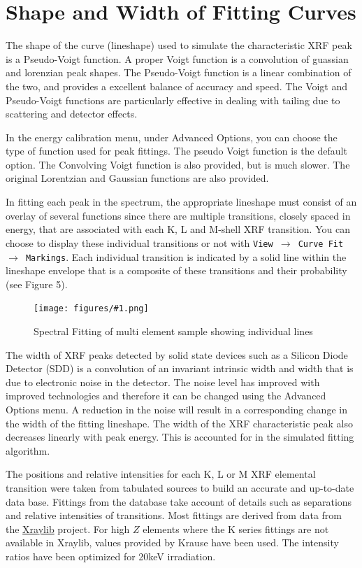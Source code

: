 \documentclass[article,twoside,11pt]{report}
\newcommand{\command}[1]{\texttt{#1}}
\newcommand{\menu}[0]{$\rightarrow$}
\newcommand{\screenshot}[2]{%
\begin{figure}[h!]
\centering\texttt{[image: figures/\#1.png]}
\caption{#2}
\end{figure}
}
\newcommand{\tocsection}[1]{\section*{#1}\addcontentsline{toc}{section}{#1}}
\begin{document}
\tocsection{Shape and Width of Fitting Curves}

The shape of the curve (lineshape) used to simulate the characteristic XRF peak is a Pseudo-Voigt function. A proper Voigt function is a convolution of guassian and lorenzian peak shapes. The Pseudo-Voigt function is a linear combination of the two, and provides a excellent balance of accuracy and speed. The Voigt and Pseudo-Voigt functions are particularly effective in dealing with tailing due to scattering and detector effects. 

In the energy calibration menu, under Advanced Options, you can choose the type of function used for peak fittings. The pseudo Voigt function is the default option. The Convolving Voigt function is also provided, but is much slower. The original Lorentzian and Gaussian functions are also provided.

In fitting each peak in the spectrum, the appropriate lineshape must consist of an overlay of several functions since there are multiple transitions, closely spaced in energy, that are associated with each K, L and M-shell XRF transition. You can choose to display these individual transitions or not with \command{View \menu\ Curve Fit \menu\ Markings}. Each individual transition is indicated by a solid line within the lineshape envelope that is a composite of these transitions and their probability (see Figure 5). 

\screenshot{fitting-markings}{Spectral Fitting of multi element sample showing individual lines}

The width of XRF peaks detected by solid state devices such as a Silicon Diode Detector (SDD) is a convolution of an invariant intrinsic width and width that is due to electronic noise in the detector. The noise level has improved with improved technologies and therefore it can be changed using the Advanced Options menu. A reduction in the noise will result in a corresponding change in the width of the fitting lineshape. The width of the XRF characteristic peak also decreases linearly with peak energy. This is accounted for in the simulated fitting algorithm.   

The positions and relative intensities for each K, L or M XRF elemental transition were taken from tabulated sources to build an accurate and up-to-date data base. Fittings from the database take account of details such as separations and relative intensities of transitions. Most fittings are derived from data from the \href{https://github.com/tschoonj/xraylib}{Xraylib} \cite{xraylib} project. For high $Z$ elements where the K series fittings are not available in Xraylib, values provided by Krause \cite{krause} have been used. The intensity ratios have been optimized for 20keV irradiation.
\end{document}
